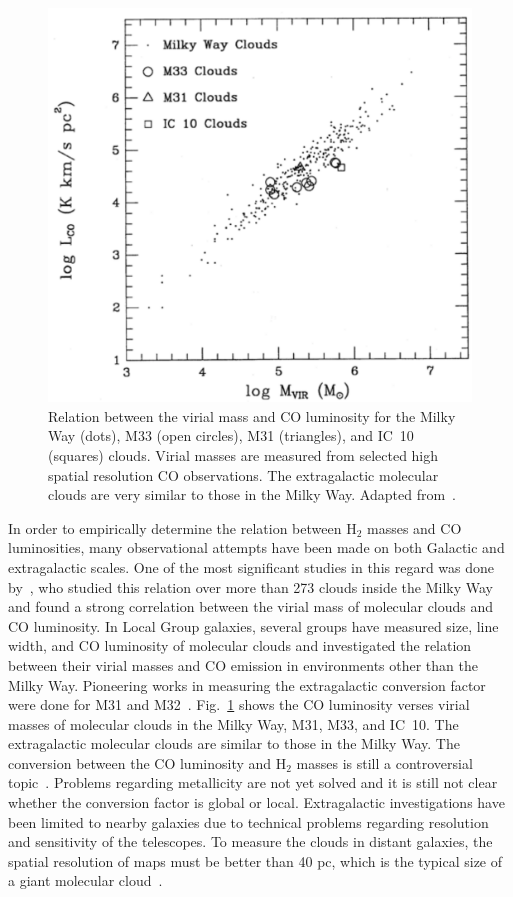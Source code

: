 \begin{figure}
\label{fig: mco_ch}
\centering
\includegraphics[width=16cm]{../image_intro/mvirial_lco.pdf}
\caption{Relation between the virial mass and CO luminosity for the Milky Way (dots), M33 (open circles), M31 (triangles), and IC~10 (squares) clouds. Virial masses are measured from selected high spatial resolution CO observations. The extragalactic molecular clouds are very similar to those in the Milky Way. Adapted from~\cite{Young91}.}
\end{figure}

In order to empirically determine the relation between H$_2$ masses and CO luminosities, many observational attempts have been made on both Galactic and extragalactic scales. 
One of the most significant studies in this regard was done by~\cite{Solomon87}, who studied this relation over more than 273 clouds inside the Milky Way and found a strong correlation between the virial mass of molecular clouds and CO luminosity. 
In Local Group galaxies, several groups have measured size, line width, and CO luminosity of molecular clouds and investigated the relation between  their virial masses and CO emission in environments other than the Milky Way. 
Pioneering works in measuring the extragalactic conversion factor were done for M31 and M32~\citep[e.g.,][]{Wilson89, Wilson90}. 
Fig.~\ref{fig: mco_ch} shows the CO luminosity verses virial masses of molecular clouds in the Milky Way, M31, M33, and IC~10. 
The extragalactic molecular clouds are similar to those in the Milky Way. 
The conversion between the CO luminosity and H$_2$ masses is still a controversial topic~\citep[e.g.][]{Narayanan11, Bolato13, Sandstrom13}.
Problems regarding metallicity are not yet solved and it is still not clear whether the conversion factor is global or local. 
Extragalactic investigations have been limited to nearby galaxies due to technical problems regarding resolution and sensitivity of the telescopes. 
To measure the clouds in distant galaxies, the spatial resolution of maps must be better than 40 pc, which is the typical size of a giant molecular cloud~\citep[e.g.][and refrences therein]{Young91,Bolato13}. 

